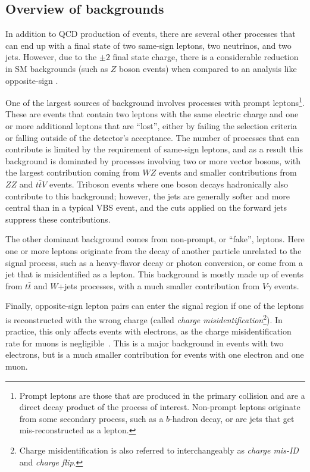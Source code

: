 \subsection{Overview of backgrounds}\label{ssww13tev:background_overview}
In addition to QCD production of \ssww events, there are several other processes that can end up with a final state of two same-sign leptons, two neutrinos, and two jets.
However, due to the $\pm 2$ final state charge, there is a considerable reduction in SM backgrounds (such as $Z$ boson events) when compared to an analysis like opposite-sign \oswwjj.

One of the largest sources of background involves processes with prompt leptons\footnote{Prompt leptons are those that are produced in the primary collision and are a direct decay product of the process of interest.  Non-prompt leptons originate from some secondary process, such as a $b$-hadron decay, or are jets that get mis-reconstructed as a lepton.}.
These are events that contain two leptons with the same electric charge and one or more additional leptons that are ``lost'', either by failing the selection criteria or falling outside of the detector's acceptance.
The number of processes that can contribute is limited by the requirement of same-sign leptons, and as a result this background is dominated by processes involving two or more vector bosons, with the largest contribution coming from $WZ$ events and smaller contributions from $ZZ$ and $t\bar{t}V$ events.
Triboson events where one boson decays hadronically also contribute to this background; however, the jets are generally softer and more central than in a typical VBS event, and the cuts applied on the forward jets suppress these contributions.

The other dominant background comes from non-prompt, or ``fake'', leptons.
Here one or more leptons originate from the decay of another particle unrelated to the signal process, such as a heavy-flavor decay or photon conversion, or come from a jet that is misidentified as a lepton.
This background is mostly made up of events from $t\bar{t}$ and $W$+jets processes, with a much smaller contribution from $V\gamma$ events. 

Finally, opposite-sign lepton pairs can enter the signal region if one of the leptons is reconstructed with the wrong charge (called \emph{charge misidentification}\footnote{Charge misidentification is also referred to interchangeably as \emph{charge mis-ID} and \emph{charge flip}.}).
In practice, this only affects events with electrons, as the charge misidentification rate for muons is negligible~\cite{2013.muon-flip}.
This is a major background in events with two electrons, but is a much smaller contribution for events with one electron and one muon.

%
